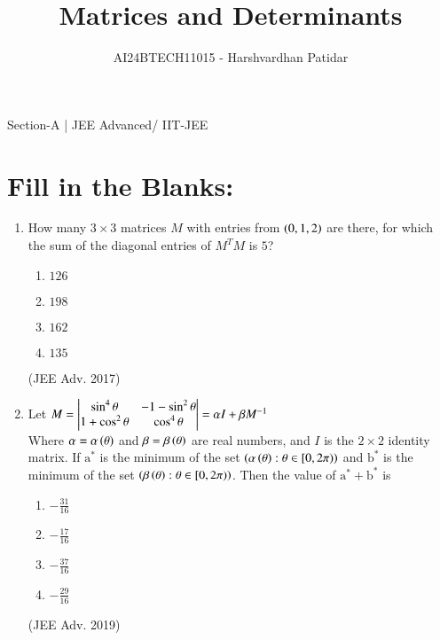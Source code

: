 \documentclass[journal,12pt,twocolumn]{IEEEtran}
\theoremstyle{remark}
\begin{document}

\vspace{3cm}

\title{Matrices and Determinants}
\author{AI24BTECH11015 - Harshvardhan Patidar}
\maketitle
\newpage
\bigskip

\renewcommand{\thefigure}{\theenumi}
\renewcommand{\thetable}{\theenumi}



Section-A | JEE Advanced/ IIT-JEE
 

		\section{Fill in the Blanks:}
			\begin{enumerate}
				\item
					How many $3 \times 3$ matrices $M$ with entries from $\left(0,1,2\right)$ are there, for which the sum of the diagonal entries of $M^TM$ is $5$?
						\begin{enumerate}
							\item $126$
							\item $198$
							\item $162$
							\item $135$
						\end{enumerate}
						\hfill (JEE Adv. 2017)\\
				\item
					Let $M= \begin{vmatrix}
						\sin^4 \theta & -1 -\sin^2 \theta\\
						1+\cos^2 \theta & \cos^4 \theta
						\end{vmatrix} = 
						\alpha I + \beta M^{-1}$\\
					Where $\alpha = \alpha \left(\theta\right)$ and $\beta = \beta \left(\theta\right)$ are real numbers, and $I$ is the $2 \times 2$ identity matrix. If $\mathrm{a^*}$ is the minimum of the set $\left(\alpha \left(\theta\right) : \theta \in [0, 2 \pi)\right)$ and $\mathrm{b^*}$ is the minimum of the set $\left(\beta \left(\theta\right) : \theta \in [0, 2 \pi)\right)$. Then the value of $\mathrm{a^*} + \mathrm{b^*}$ is
						\begin{enumerate}
							\item $-\frac{31}{16}$
							\item $-\frac{17}{16}$
							\item $-\frac{37}{16}$
							\item $-\frac{29}{16}$
						\end{enumerate}
						\hfill (JEE Adv. 2019)\\
			\end{enumerate}
\end{document}
